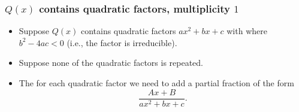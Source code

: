 \begin{frame}
\frametitle{$Q(x)$ contains quadratic factors, multiplicity $1$}
\begin{itemize}
\item Suppose $Q(x)$ contains quadratic factors $ax^2 + bx + c$ with where $b^2-4ac < 0$ (i.e., the factor is irreducible).
\item<2-> Suppose none of the quadratic factors is repeated.
\item<3-> The for each quadratic factor we need to add a partial fraction of the form
\[
\frac{Ax+B}{ax^2+bx+c}.
\]
\end{itemize}
\end{frame}
